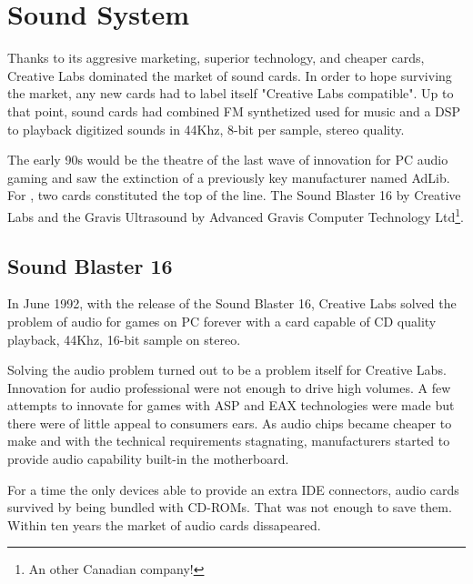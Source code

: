 \section{Sound System}
Thanks to its aggresive marketing, superior technology, and cheaper cards, Creative Labs dominated the market of sound cards. In order to hope surviving the market, any new cards had to label itself "Creative Labs compatible". Up to that point, sound cards had combined FM synthetized used for music and a DSP to playback digitized sounds in 44Khz, 8-bit per sample, stereo quality.\\
\par
 The early 90s would be the theatre of the last wave of innovation for PC audio gaming and saw the extinction of a previously key manufacturer named AdLib. For \doom, two cards constituted the top of the line. The Sound Blaster 16 by Creative Labs and the Gravis Ultrasound by Advanced Gravis Computer Technology Ltd\footnote{An other Canadian company!}.\\
\par
\subsection{Sound Blaster 16}
 In June 1992, with the release of the Sound Blaster 16, Creative Labs solved the problem of audio for games on PC forever with a card capable of CD quality playback, 44Khz, 16-bit sample on stereo.\\
\par
{}
\par
Solving the audio problem turned out to be a problem itself for Creative Labs. Innovation for audio professional were not enough to drive high volumes. A few attempts to innovate for games with ASP and EAX technologies were made but there were of little appeal to consumers ears. As audio chips became cheaper to make and with the technical requirements stagnating, manufacturers started to provide audio capability built-in the motherboard.\\
\par
For a time the only devices able to provide an extra IDE connectors, audio cards survived by being bundled with CD-ROMs. That was not enough to save them. Within ten years the market of audio cards dissapeared.\\
\par
{}
\par









